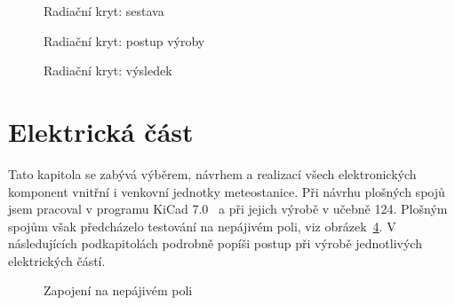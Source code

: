             \newpage

            \begin{figure}[htb]
            \caption{Radiační kryt: sestava}
            \label{RadSestava}
            \end{figure}

            \begin{figure}[htb]
            \caption{Radiační kryt: postup výroby}
            \label{RadPostup}
            \end{figure}

            \begin{figure}[htb]
            \caption{Radiační kryt: výsledek}
            \label{RadVysledek}
            \end{figure}

    \clearpage

    \section{Elektrická část} \label{ElCast}
        Tato kapitola se zabývá výběrem, návrhem a realizací všech elektronických komponent vnitřní i venkovní jednotky meteostanice. Při návrhu plošných spojů jsem pracoval v programu KiCad 7.0~\cite{KiCad} a při jejich výrobě v učebně 124. Plošným spojům však předcházelo testování na nepájivém poli, viz obrázek~\ref{NepajivePole}. V následujících podkapitolách podrobně popíši postup při výrobě jednotlivých elektrických částí.

        \begin{figure}[htb]
        \caption{Zapojení na nepájivém poli}
        \label{NepajivePole}
        \end{figure}

